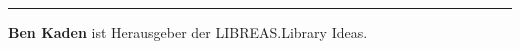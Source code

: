 \begin{center}\rule{0.5\linewidth}{0.5pt}\end{center}

\textbf{Ben Kaden} ist Herausgeber der LIBREAS.Library Ideas.
